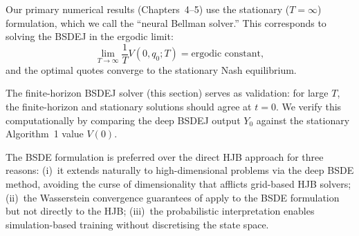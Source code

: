 Our primary numerical results (Chapters~4--5) use the stationary
($T = \infty$) formulation, which we call the ``neural Bellman solver.''
This corresponds to solving the BSDEJ in the ergodic limit:
\begin{equation}
  \lim_{T \to \infty} \frac{1}{T} V(0, q_0; T) = \text{ergodic constant},
\end{equation}
and the optimal quotes converge to the stationary Nash equilibrium.

The finite-horizon BSDEJ solver (this section) serves as validation:
for large $T$, the finite-horizon and stationary solutions should agree
at $t = 0$. We verify this computationally by comparing the deep BSDEJ
output $Y_0$ against the stationary Algorithm~1 value $V(0)$.

\begin{remark}
The BSDE formulation is preferred over the direct HJB approach for
three reasons: (i)~it extends naturally to high-dimensional problems
via the deep BSDE method, avoiding the curse of dimensionality that
afflicts grid-based HJB solvers; (ii)~the Wasserstein convergence
guarantees of \citet{han2022} apply to the BSDE formulation but not
directly to the HJB; (iii)~the probabilistic interpretation enables
simulation-based training without discretising the state space.
\end{remark}
